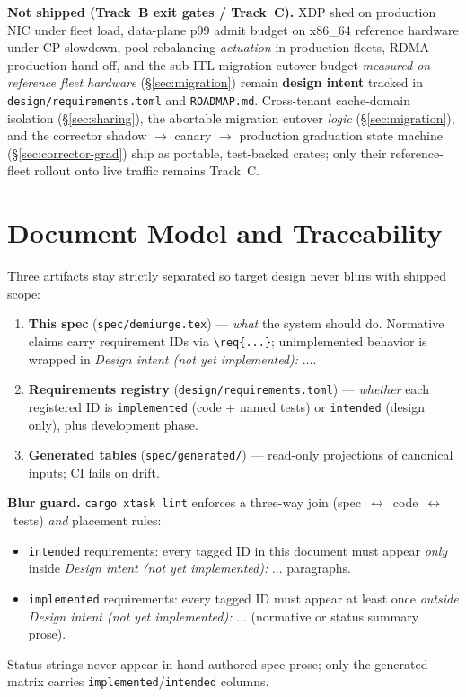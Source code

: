 \documentclass[11pt]{article}
\newcommand{\intent}[1]{\textit{Design intent (not yet implemented):} #1}
\begin{document}
\textbf{Not shipped (Track~B exit gates / Track~C).} XDP shed on production NIC
under fleet load, data-plane p99 admit budget on x86\_64 reference hardware under
CP slowdown, pool rebalancing \emph{actuation} in production fleets, RDMA production
hand-off, and the sub-ITL migration cutover budget \emph{measured on reference fleet
hardware} (\S\ref{sec:migration}) remain \textbf{design intent} tracked in
\texttt{design/requirements.toml} and \texttt{ROADMAP.md}. Cross-tenant
cache-domain isolation (\S\ref{sec:sharing}), the abortable migration cutover
\emph{logic} (\S\ref{sec:migration}), and the corrector shadow $\to$ canary
$\to$ production graduation state machine (\S\ref{sec:corrector-grad}) ship
as portable, test-backed crates; only their reference-fleet rollout onto
live traffic remains Track~C.

\begin{table}[h]
  \centering
  
  \caption{Conformance matrix (generated from \texttt{design/requirements.toml}).
  \emph{Implemented} rows are backed by named tests in CI; \emph{intended} rows
  are design targets only. Never hand-edit this table.}
  \label{tab:conformance}
\end{table}

\section{Document Model and Traceability}\label{sec:docmodel}
Three artifacts stay strictly separated so target design never blurs with
shipped scope:
\begin{enumerate}[nosep]
  \item \textbf{This spec} (\texttt{spec/demiurge.tex}) --- \emph{what} the system
        should do. Normative claims carry requirement IDs via \texttt{\textbackslash req\{...\}};
        unimplemented behavior
        is wrapped in \intent{...}.
  \item \textbf{Requirements registry} (\texttt{design/requirements.toml}) ---
        \emph{whether} each registered ID is \texttt{implemented} (code + named tests)
        or \texttt{intended} (design only), plus development phase.
  \item \textbf{Generated tables} (\texttt{spec/generated/}) --- read-only
        projections of canonical inputs; CI fails on drift.
\end{enumerate}

\textbf{Blur guard.} \texttt{cargo xtask lint} enforces a three-way join
(spec~$\leftrightarrow$~code~$\leftrightarrow$~tests) \emph{and} placement rules:
\begin{itemize}[nosep]
  \item \texttt{intended} requirements: every tagged ID in this document must appear
        \emph{only} inside \intent{...} paragraphs.
  \item \texttt{implemented} requirements: every tagged ID must appear at least once
        \emph{outside} \intent{...} (normative or status summary prose).
\end{itemize}
Status strings never appear in hand-authored spec prose; only the generated matrix
carries \texttt{implemented}/\texttt{intended} columns.
\end{document}
